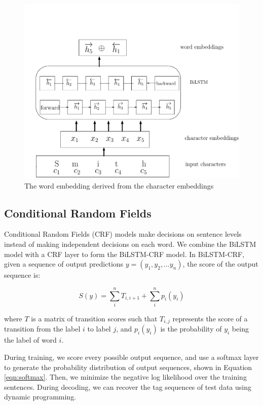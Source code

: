 \begin{figure}
  \centering
  \includegraphics[scale=0.6]{bilstmchar.pdf}
 \caption{The word embedding derived from the character embeddings}
  \label{fig:charlstm}
\end{figure}

\subsection{Conditional Random Fields}

Conditional Random Fields (CRF) models make decisions on sentence levels instead of making independent decisions on each word. We combine the BiLSTM model with a CRF layer to form the BiLSTM-CRF model. In BiLSTM-CRF, given a sequence of output predictions $y=\left( y_{1},y_{2},\ldots y_{n}\right)$, the score of the output sequence is:

\begin{equation}
S\left( y\right)=\sum _{i}^{n}T_{i,i+1}+\sum _{i}^{n}p_{i}\left(y_{i}\right)
\end{equation}

where $T$ is a matrix of transition scores such that $T_{i,j}$ represents the score of a transition from the label $i$ to label $j$, and $p_{i}\left(y_{i}\right)$ is the probability of $y_{i}$ being the label of word $i$.

During training, we score every possible output sequence, and use a softmax layer to generate the probability distribution of output sequences, shown in Equation \ref{eqn:softmax}. Then, we minimize the negative log likelihood over the training sentences. During decoding, we can recover the tag sequences of test data using dynamic programming.

